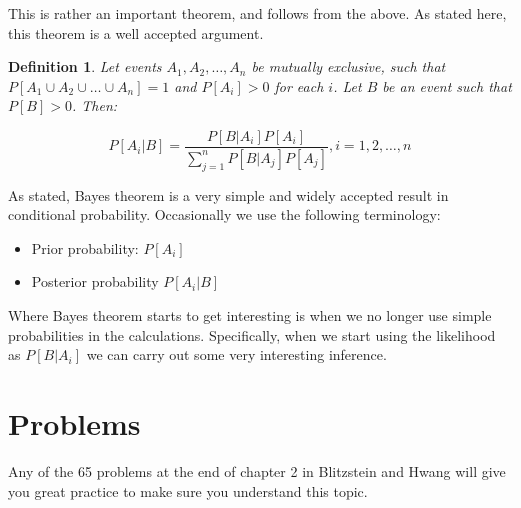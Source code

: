 \documentclass[12pt]{extbook}
\newtheorem{df}{Definition}[section]
\begin{document}
This is rather an important theorem, and follows from the above.   As stated here, this theorem is a well accepted argument.

\begin{df}
Let events $A_1, A_2, \ldots, A_n$ be mutually exclusive, such that $P[A_1 \cup A_2 \cup \ldots \cup A_n] = 1$ and $P[A_i] > 0$ for each $i$.   Let $B$ be an event such that $P[B] > 0$.  Then:

\begin{displaymath}
P[A_i | B] = \frac{P[B|A_i]P[A_i]}{\sum_{j=1}^n P[B|A_j]P[A_j]}, i=1,2,\ldots, n
\end{displaymath}
\end{df}

 

As stated, Bayes theorem is a very simple and widely accepted result in conditional probability.   Occasionally we use the following terminology:

\begin{itemize}
\item Prior probability: $P[A_i]$
\item Posterior probability $P[A_i | B]$
\end{itemize}


Where Bayes theorem starts to get interesting is when we no longer use simple probabilities in the calculations.  Specifically, when we start using the likelihood as $P[B|A_i]$ we can carry out some very interesting inference.

\section{Problems}

\begin{enumerate}











\end{enumerate}

Any of the 65 problems at the end of chapter 2 in Blitzstein and Hwang will give you great practice to make sure you understand this topic.
\end{document}
